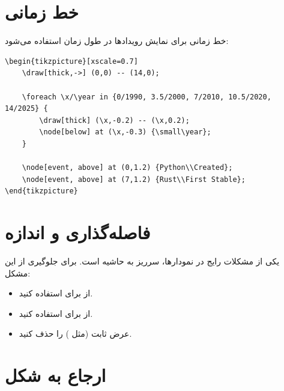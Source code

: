 
\section{خط زمانی}
\label{sec:graphics-timeline}

خط زمانی برای نمایش رویدادها در طول زمان
استفاده می‌شود:

\begin{latin}
\begin{verbatim}
\begin{tikzpicture}[xscale=0.7]
    \draw[thick,->] (0,0) -- (14,0);

    \foreach \x/\year in {0/1990, 3.5/2000, 7/2010, 10.5/2020, 14/2025} {
        \draw[thick] (\x,-0.2) -- (\x,0.2);
        \node[below] at (\x,-0.3) {\small\year};
    }

    \node[event, above] at (0,1.2) {Python\\Created};
    \node[event, above] at (7,1.2) {Rust\\First Stable};
\end{tikzpicture}
\end{verbatim}
\end{latin}

\section{فاصله‌گذاری و اندازه}
\label{sec:graphics-sizing}

یکی از مشکلات رایج در نمودارها، سرریز به
حاشیه است. برای جلوگیری از این مشکل:

\begin{itemize}
    \item از  برای
     استفاده کنید.
    \item از 
    برای  استفاده کنید.
    \item عرض ثابت (مثل ) را
    حذف کنید.
\end{itemize}


\section{ارجاع به شکل}
\label{sec:graphics-references}

